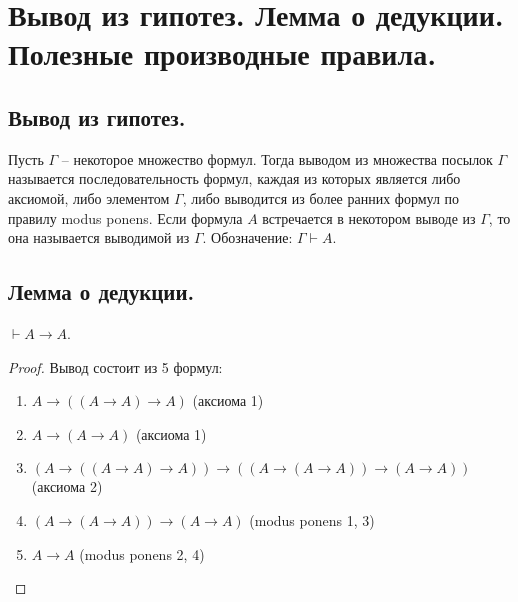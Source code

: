 \section{Вывод из гипотез. Лемма о дедукции. Полезные производные правила.}

\subsection{Вывод из гипотез.}

\begin{definition}
  Пусть $\Gamma$ -- некоторое множество формул. Тогда выводом из множества посылок $\Gamma$ называется последовательность формул, каждая из которых является либо аксиомой, либо элементом $\Gamma$, либо выводится из более ранних формул по правилу modus ponens. Если формула $A$ встречается в некотором выводе из $\Gamma$, то она называется выводимой из $\Gamma$. Обозначение: $\Gamma \vdash A$.
\end{definition}

\subsection{Лемма о дедукции.}

\begin{lemma}
  $\vdash A \to A$.
  \begin{proof}
    Вывод состоит из 5 формул:
    \begin{enumerate}
      \item $A \to ((A \to A) \to A)$ (аксиома 1)
      \item $A \to (A \to A)$ (аксиома 1)
      \item $(A \to ((A \to A) \to A)) \to ((A \to (A \to A)) \to (A \to A))$ (аксиома 2)
      \item $(A \to (A \to A)) \to (A \to A)$ (modus ponens 1, 3)
      \item $A \to A$ (modus ponens 2, 4)
    \end{enumerate}
  \end{proof}
\end{lemma}


